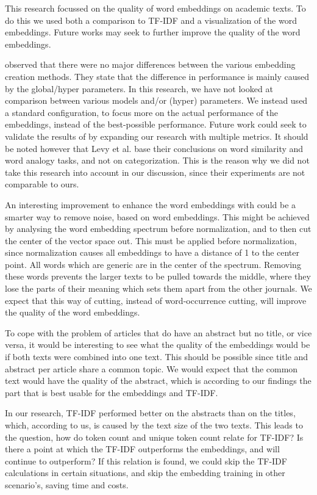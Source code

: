 \documentclass[../../Thesis.tex]{subfiles}
\begin{document}
This research focussed on the quality of word embeddings on academic texts. To do this we used both a comparison to TF-IDF and a visualization of the word embeddings. Future works may seek to further improve the quality of the word embeddings. 

\citet{levy2015improving} observed that there were no major differences between the various embedding creation methods. They state that the difference in performance is mainly caused by the global/hyper parameters. In this research, we have not looked at comparison between various models and/or (hyper) parameters. We instead used a standard configuration, to focus more on the actual performance of the embeddings, instead of the best-possible performance. Future work could seek to validate the results of \citet{levy2015improving} by expanding our research with multiple metrics. It should be noted however that Levy et al. base their conclusions on word similarity and word analogy tasks, and not on categorization. This is the reason why we did not take this research into account in our discussion, since their experiments are not comparable to ours.

An interesting improvement to enhance the word embeddings with could be a smarter way to remove noise, based on word embeddings. This might be achieved by analysing the word embedding spectrum before normalization, and to then cut the center of the vector space out. This must be applied before normalization, since normalization causes all embeddings to have a distance of 1 to the center point. All words which are generic are in the center of the spectrum. Removing these words prevents the larger texts to be pulled towards the middle, where they lose the parts of their meaning which sets them apart from the other journals. We expect that this way of cutting, instead of word-occurrence cutting, will improve the quality of the word embeddings.

To cope with the problem of articles that do have an abstract but no title, or vice versa, it would be interesting to see what the quality of the embeddings would be if both texts were combined into one text. This should be possible since title and abstract per article share a common topic. We would expect that the common text would have the quality of the abstract, which is according to our findings the part that is best usable for the embeddings and TF-IDF.

In our research, TF-IDF performed better on the abstracts than on the titles, which, according to us, is caused by the text size of the two texts. This leads to the question, how do token count and unique token count relate for TF-IDF? Is there a point at which the TF-IDF outperforms the embeddings, and will continue to outperform? If this relation is found,  we could skip the TF-IDF calculations in certain situations, and skip the embedding training in other scenario's, saving time and costs.
\end{document}

